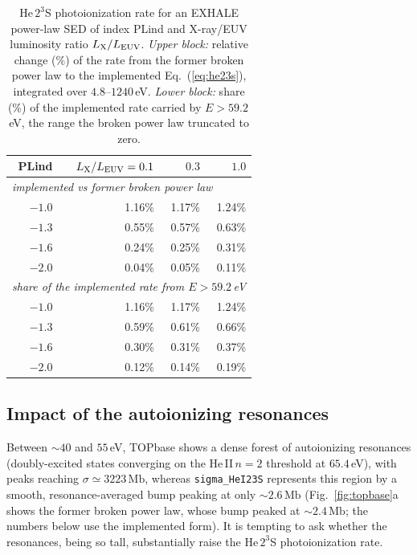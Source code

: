 \documentclass[english,a4paper]{my_memo}
\newcommand{\Mb}{\mathrm{Mb}}
\newcommand{\sig}{\sigma}
\begin{document}
\begin{table}[h]
\centering
\caption{He\,$2^3$S photoionization rate for an EXHALE power-law SED of index
PLind and X-ray/EUV luminosity ratio $L_{\rm X}/L_{\rm EUV}$. \emph{Upper
block:} relative change (\%) of the rate from the former broken power law to
the implemented Eq.~(\ref{eq:he23s}), integrated over $4.8$--$1240\,$eV.
\emph{Lower block:} share (\%) of the implemented rate carried by $E>59.2\,$eV,
the range the broken power law truncated to zero.}
\label{tab:rateimpact}
\begin{tabular}{rrrr}
\toprule
PLind & $L_{\rm X}/L_{\rm EUV}=0.1$ & $0.3$ & $1.0$\\
\midrule
\multicolumn{4}{l}{\emph{implemented vs former broken power law}}\\
$-1.0$ & 1.16\% & 1.17\% & 1.24\%\\
$-1.3$ & 0.55\% & 0.57\% & 0.63\%\\
$-1.6$ & 0.24\% & 0.25\% & 0.31\%\\
$-2.0$ & 0.04\% & 0.05\% & 0.11\%\\
\midrule
\multicolumn{4}{l}{\emph{share of the implemented rate from $E>59.2\,$eV}}\\
$-1.0$ & 1.16\% & 1.17\% & 1.24\%\\
$-1.3$ & 0.59\% & 0.61\% & 0.66\%\\
$-1.6$ & 0.30\% & 0.31\% & 0.37\%\\
$-2.0$ & 0.12\% & 0.14\% & 0.19\%\\
\bottomrule
\end{tabular}
\end{table}

\subsection{Impact of the autoionizing resonances}
\label{sec:resonance}

Between $\sim$$40$ and $55\,$eV, TOPbase shows a dense forest of
autoionizing resonances (doubly-excited states converging on the
He\,II\,$n=2$ threshold at $65.4\,$eV), with peaks reaching
$\sig\simeq3223\,\Mb$, whereas \texttt{sigma\_HeI23S} represents this
region by a smooth, resonance-averaged bump peaking at only
$\sim$$2.6\,\Mb$ (Fig.~\ref{fig:topbase}a shows the former broken power
law, whose bump peaked at $\sim$$2.4\,\Mb$; the numbers below use the
implemented form). It is tempting to ask whether the resonances,
being so tall, substantially raise the He\,$2^3$S photoionization rate.
\end{document}
